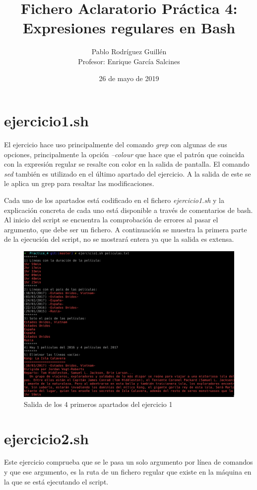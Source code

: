 \documentclass[12pt,a4paper]{article}
\author{Pablo Rodríguez Guillén \\ Profesor: Enrique García Salcines}
\title{\textbf{Fichero Aclaratorio Práctica 4: Expresiones regulares en Bash}}
\date{26 de mayo de 2019}
\begin{document}
\maketitle
\tableofcontents
\newpage

\section{ejercicio1.sh}
El ejercicio hace uso principalmente del comando \emph{grep} con algunas de sus opciones, principalmente la opción \emph{--colour} que hace que el patrón que coincida con la expresión regular se resalte con color en la salida de pantalla. El comando \emph{sed} también es utilizado en el último apartado del ejercicio. A la salida de este se le aplica un grep para resaltar las modificaciones.

Cada uno de los apartados está codificado en el fichero \emph{ejercicio1.sh} y la explicación concreta de cada uno está disponible a través de comentarios de bash. Al inicio del script se encuentra la comprobación de errores al pasar el argumento, que debe ser un fichero. A continuación se muestra la primera parte de la ejecución del script, no se mostrará entera ya que la salida es extensa.

\begin{figure}[ht]
	\centering
	\includegraphics[width=1\textwidth]{images/ejercicio1.png}
	\caption{Salida de los 4 primeros apartados del ejercicio 1}
\end{figure}

\newpage

\section{ejercicio2.sh}
Este ejercicio comprueba que se le pasa un solo argumento por línea de comandos y que ese argumento, es la ruta de un fichero regular que existe en la máquina en la que se está ejecutando el script.
\end{document}
